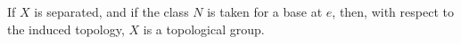 If $X$ is separated, and if the class $N$ is taken for a base at $e$, then, with respect to the induced topology, $X$ is a topological group.
